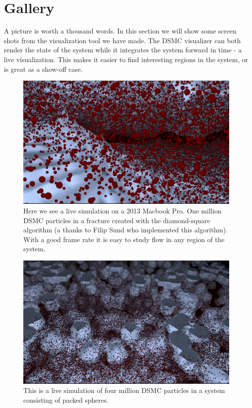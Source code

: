 \section{Gallery}
\label{sec:vis_gallery}
A picture is worth a thousand words. In this section we will show some screen shots from the visualization tool we have made. The DSMC visualizer can both render the state of the system while it integrates the system forward in time - a live visualization. This makes it easier to find interesting regions in the system, or is great as a show-off case.

\begin{figure}[htb]
\begin{center}
\includegraphics[width=\textwidth, trim=0cm 0cm 0cm 0cm, clip]{visualization/figures/marching_cubes_fracture.png}
\end{center}
\caption{Here we see a live simulation on a 2013 Macbook Pro. One million DSMC particles in a fracture created with the diamond-square algorithm (a thanks to Filip Sund who implemented this algorithm). With a good frame rate it is easy to study flow in any region of the system. }
\label{fig:vis_marching_cubes}
\end{figure}

\begin{figure}[htb]
\begin{center}
\includegraphics[width=\textwidth, trim=0cm 0cm 0cm 0cm, clip]{visualization/figures/marching_cubes_spheres_2.png}
\end{center}
\caption{This is a live simulation of four million DSMC particles in a system consisting of packed spheres.}
\label{fig:vis_marching_cubes_2}
\end{figure}

